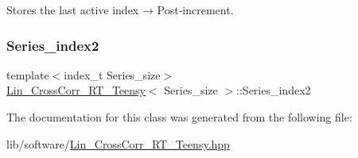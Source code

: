 Stores the last active index → Post-\/increment. 

\mbox{\label{classLin__CrossCorr__RT__Teensy_a4f84a456a7d6e90e8676e4c5ed059776}} 
\subsubsection{\texorpdfstring{Series\+\_\+index2}{Series\_index2}\hspace{0.1cm}{\footnotesize\ttfamily [2/2]}}
{\footnotesize\ttfamily template$<$index\+\_\+t Series\+\_\+size$>$ \\
\hyperlink{classLin__CrossCorr__RT__Teensy}{Lin\+\_\+\+Cross\+Corr\+\_\+\+R\+T\+\_\+\+Teensy}$<$ Series\+\_\+size $>$\+::Series\+\_\+index2}



The documentation for this class was generated from the following file\+:\begin{DoxyCompactItemize}
\item 
lib/software/\hyperlink{Lin__CrossCorr__RT__Teensy_8hpp}{Lin\+\_\+\+Cross\+Corr\+\_\+\+R\+T\+\_\+\+Teensy.\+hpp}\end{DoxyCompactItemize}
